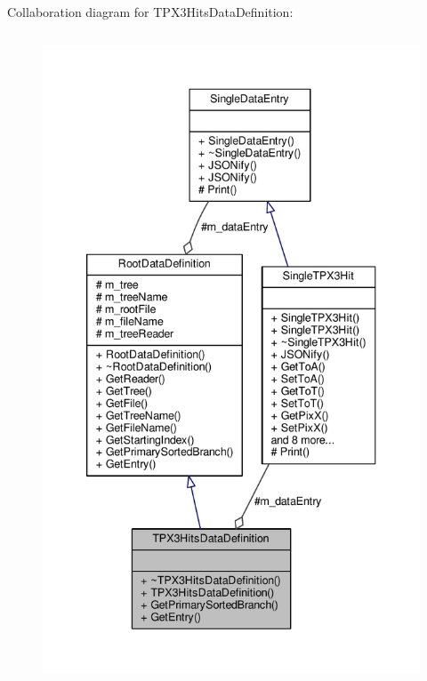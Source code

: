 Collaboration diagram for T\+P\+X3\+Hits\+Data\+Definition\+:
\nopagebreak
\begin{figure}[H]
\begin{center}
\leavevmode
\includegraphics[height=550pt]{classTPX3HitsDataDefinition__coll__graph}
\end{center}
\end{figure}
